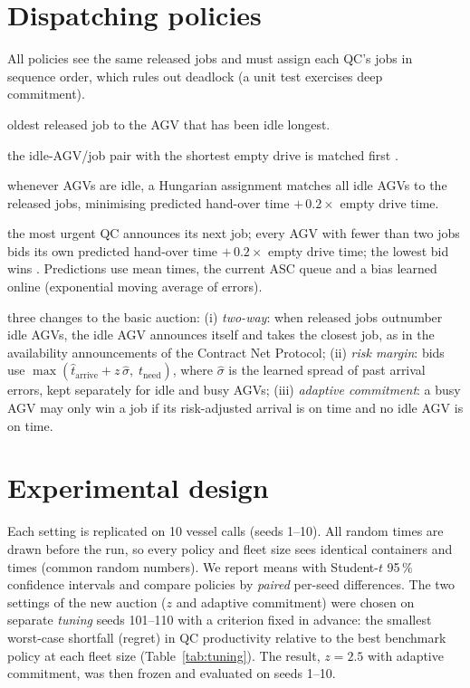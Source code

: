 \documentclass[11pt,a4paper]{article}
\begin{document}
\section{Dispatching policies}\label{sec:policies}
All policies see the same released jobs and must assign each QC's jobs in sequence order, which rules out
deadlock (a unit test exercises deep commitment).
\begin{description}\itemsep2pt
\item[FIFO] oldest released job to the AGV that has been idle longest.
\item[Nearest vehicle] the idle-AGV/job pair with the shortest empty drive is matched first \cite{egbelu1984}.
\item[Central] whenever AGVs are idle, a Hungarian assignment \cite{kuhn1955} matches all idle AGVs to the released
jobs, minimising predicted hand-over time $+\,0.2\times$ empty drive time.
\item[Basic auction] the most urgent QC announces its next job; every AGV with fewer than two jobs bids its
own predicted hand-over time $+\,0.2\times$ empty drive time; the lowest bid wins \cite{smith1980}. Predictions
use mean times, the current ASC queue and a bias learned online (exponential moving average of errors).
\item[Risk-aware two-way auction (new)] three changes to the basic auction:
(i) \emph{two-way}: when released jobs outnumber idle AGVs, the idle AGV announces itself and takes the closest
job, as in the availability announcements of the Contract Net Protocol;
(ii) \emph{risk margin}: bids use $\max(\hat t_\text{arrive} + z\,\hat\sigma,\; t_\text{need})$, where
$\hat\sigma$ is the learned spread of past arrival errors, kept separately for idle and busy AGVs;
(iii) \emph{adaptive commitment}: a busy AGV may only win a job if its risk-adjusted arrival is on time
and no idle AGV is on time.
\end{description}

\section{Experimental design}\label{sec:design}
Each setting is replicated on 10 vessel calls (seeds 1--10). All random times are drawn before the run,
so every policy and fleet size sees identical containers and times (common random numbers). We report
means with Student-$t$ 95\,\% confidence intervals and compare policies by \emph{paired} per-seed
differences. The two settings of the new auction ($z$ and adaptive commitment) were chosen on separate
\emph{tuning} seeds 101--110 with a criterion fixed in advance: the smallest worst-case shortfall
(regret) in QC productivity relative to the best benchmark policy at each fleet size (Table~\ref{tab:tuning}).
The result, $z=2.5$ with adaptive commitment, was then frozen and evaluated on seeds 1--10.
\end{document}
